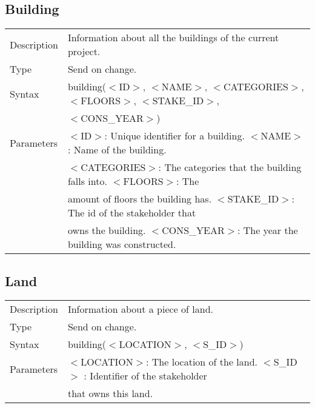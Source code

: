 \documentclass{article}
\begin{document}
\subsection*{Building}

\begin{tabular}{ l l }
  Description & Information about all the buildings of the current project.  \\
  Type & Send on change. \\
  Syntax & building($<$ID$>$, $<$NAME$>$, $<$CATEGORIES$>$, $<$FLOORS$>$, $<$STAKE\_ID$>$, \\
    & $<$CONS\_YEAR$>$) \\
  Parameters &  $<$ID$>$: Unique identifier for a building. $<$NAME$>$ : Name of the building. \\
    & $<$CATEGORIES$>$: The categories that the building falls into. $<$FLOORS$>$:  The \\
    & amount of floors the building has. $<$STAKE\_ID$>$: The id of the stakeholder that \\
    & owns the building. $<$CONS\_YEAR$>$: The year the building was constructed.
\end{tabular}

\subsection*{Land}

\begin{tabular}{ l l }
  Description & Information about a piece of land.  \\
  Type & Send on change. \\
  Syntax & building($<$LOCATION$>$, $<$S\_ID$>$) \\
  Parameters &  $<$LOCATION$>$: The location of the land. $<$S\_ID$>$ : Identifier of the stakeholder \\
    &  that owns this land.
\end{tabular}
\end{document}
